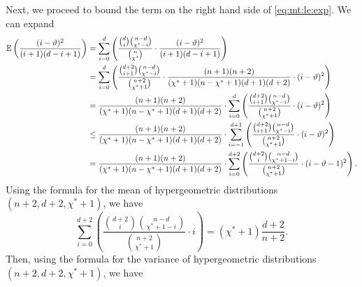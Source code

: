 \documentclass[onecolumn,letterpaper]{IEEEtran}
\newcommand{\plsize}{{\chi}}
\newcommand{\cE}{{\mathbb{E}}}
\newcommand{\mnp}{{\vartheta}}
\newcommand{\idex}{{i}}
\begin{document}
Next, we proceed to bound the term on the right hand side of \eqref{eq:mt:le:exp}.
We can expand
\begin{align}
    \cE \left( \frac{(\idex-\mnp)^2}{(\idex+1)(d-\idex+1)} \right) 
    &= \sum \limits_{\idex=0}^{d} \left( \frac{\binom{d}{\idex}\binom{n-d}{\plsize^{*}-\idex}}{\binom{n}{\plsize^{*}}} \cdot \frac{(\idex-\mnp)^2}{(\idex+1)(d-\idex+1)} \right) \notag\\
    &= \sum \limits_{\idex=0}^{d} \left( \frac{\binom{d+2}{\idex+1}\binom{n-d}{\plsize^{*}-\idex}}{\binom{n+2}{\plsize^{*}+1}} \cdot \frac{(n+1)(n+2)}{(\plsize^{*}+1)(n-\plsize^{*}+1)(d+1)(d+2)} \cdot (\idex-\mnp)^2 \right) \notag\\
    &= \frac{ (n+1)(n+2)}{(\plsize^{*}+1)(n-\plsize^{*}+1)(d+1)(d+2)} \cdot \sum \limits_{\idex=0}^{d} \left( \frac{\binom{d+2}{\idex+1}\binom{n-d}{\plsize^{*}-\idex}}{\binom{n+2}{\plsize^{*}+1}} \cdot (\idex-\mnp)^2 \right) \notag\\
    &\leq \frac{ (n+1)(n+2)}{(\plsize^{*}+1)(n-\plsize^{*}+1)(d+1)(d+2)} \cdot \sum \limits_{\idex=-1}^{d+1} \left( \frac{\binom{d+2}{\idex+1}\binom{n-d}{\plsize^{*}-\idex}}{\binom{n+2}{\plsize^{*}+1}} \cdot (\idex-\mnp)^2 \right) \notag\\
    &= \frac{ (n+1)(n+2)}{(\plsize^{*}+1)(n-\plsize^{*}+1)(d+1)(d+2)} \cdot \sum \limits_{\idex=0}^{d+2} \left( \frac{\binom{d+2}{\idex}\binom{n-d}{\plsize^{*}+1-\idex}}{\binom{n+2}{\plsize^{*}+1}} \cdot (\idex-\mnp-1)^2 \right). \label{eq:exp-expand-case2}
\end{align}
Using the formula for the mean of hypergeometric distributions $(n+2,d+2, \plsize^{*}+1)$, we have 
$$\sum \limits_{\idex=0}^{d+2} \left( \frac{\binom{d+2}{\idex}\binom{n-d}{\plsize^{*}+1-\idex}}{\binom{n+2}{\plsize^{*}+1}} \cdot \idex \right)=(\plsize^{*}+1)\frac{d+2}{n+2}.$$
Then, using the formula for the variance of hypergeometric distributions $(n+2,d+2, \plsize^{*}+1)$, we have
\end{document}
